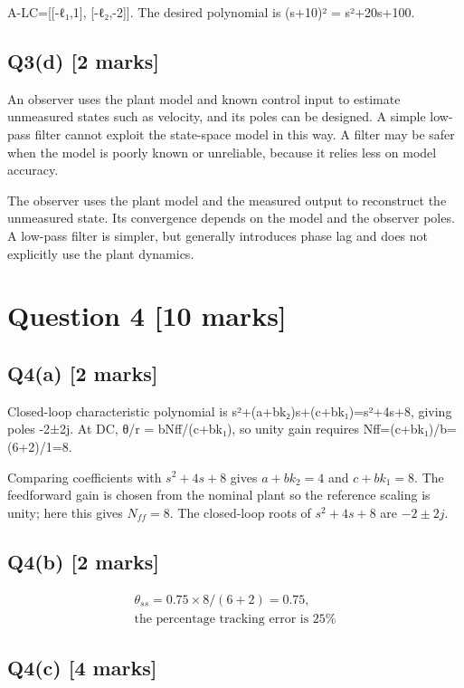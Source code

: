 \documentclass[11pt,a4paper]{article}
\begin{document}
A-LC=[[-ℓ₁,1], [-ℓ₂,-2]].
The desired polynomial is (s+10)² = s²+20s+100.

\subsection*{Q3(d) \hfill [2 marks]}

An observer uses the plant model and known control input to estimate unmeasured states such as velocity, and its poles can be designed.
A simple low-pass filter cannot exploit the state-space model in this way.
A filter may be safer when the model is poorly known or unreliable, because it relies less on model accuracy.\par\smallskip The observer uses the plant model and the measured output to reconstruct the unmeasured state. Its convergence depends on the model and the observer poles. A low-pass filter is simpler, but generally introduces phase lag and does not explicitly use the plant dynamics.

\section*{Question 4 \hfill [10 marks]}
\subsection*{Q4(a) \hfill [2 marks]}

Closed-loop characteristic polynomial is s²+(a+bk₂)s+(c+bk₁)=s²+4s+8, giving poles -2±2j.
At DC, θ/r = bNff/(c+bk₁), so unity gain requires Nff=(c+bk₁)/b=(6+2)/1=8.\par\smallskip Comparing coefficients with $s^2+4s+8$ gives $a+bk_2=4$ and $c+bk_1=8$. The feedforward gain is chosen from the nominal plant so the reference scaling is unity; here this gives $N_{ff}=8$. The closed-loop roots of $s^2+4s+8$ are $-2\pm2j$.

\subsection*{Q4(b) \hfill [2 marks]}

\[\begin{aligned}\theta_{ss} = 0.75\times8/(6+2)=0.75,\\ \text{the percentage tracking error is 25\%}\end{aligned}\]

\subsection*{Q4(c) \hfill [4 marks]}
\end{document}
